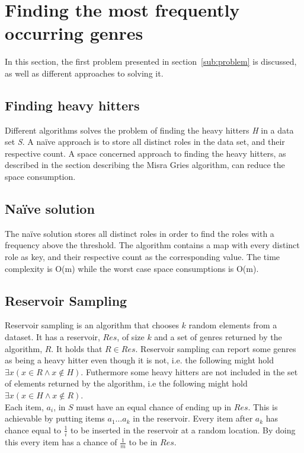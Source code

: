 
\section{Finding the most frequently occurring genres}
In this section, the first problem presented in section~\ref{sub:problem} is discussed, as well as different approaches to solving it.

\subsection{Finding heavy hitters}
Different algorithms solves the problem of finding the heavy hitters \textit{H} in a data set \textit{S}. A naïve approach is to store all distinct roles in the data set, and their respective count. A space concerned approach to finding the heavy hitters, as described in the section describing the Misra Gries algorithm, can reduce the space consumption.

\subsection{Naïve solution}
The naïve solution stores all distinct roles in order to find the roles with a frequency above the threshold. The algorithm contains a map with every distinct role as key, and their respective count as the corresponding value. The time complexity is O(m) while the worst case space consumptions is O(m).

\subsection{Reservoir Sampling}
Reservoir sampling is an algorithm that chooses \(k\) random elements from a dataset. It has a reservoir, \(Res\), of size \(k\) and a set of genres returned by the algorithm, \(R\). It holds that \(R \in Res\). Reservoir sampling can report some genres as being a heavy hitter even though it is not, i.e. the following might hold \(\exists x \left(x \in R \land x \notin H \right)\). Futhermore some heavy hitters are not included in the set of elements returned by the algorithm, i.e the following might hold \(\exists x \left(x \in H \land x \notin R \right)\).\\

Each item, \(a_i\), in \(S\) must have an equal chance of ending up in \(Res\). This is achievable by putting items \(a_1 \dots a_k\) in the reservoir. Every item after \(a_k\) has chance equal to \(\frac{1}{i}\) to be inserted in the reservoir at a random location. By doing this every item has a chance of \(\frac{1}{m}\) to be in \(Res\).

